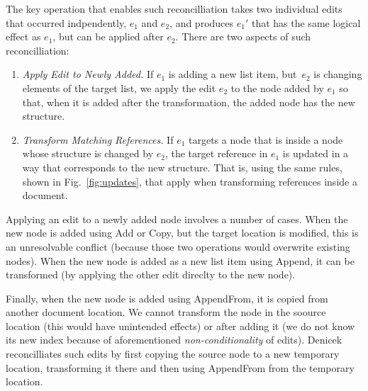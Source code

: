 \documentclass[sigconf,anonymous,screen]{acmart}
\newcommand{\ident}[1]{{\sffamily #1}}
\begin{document}
The key operation that enables such reconcilliation takes two individual edits that occurred
indpendently, $e_1$ and $e_2$, and produces $e_1'$ that has the same logical effect as
$e_1$, but can be applied after $e_2$. There are two aspects of such reconcilliation:

\begin{enumerate}
\item \emph{Apply Edit to Newly Added.} If $e_1$ is adding a new list item, but~$e_2$ is
  changing elements of the target list, we apply the edit $e_2$ to the node added by $e_1$ so
  that, when it is added after the transformation, the added node has the new structure.

\item \emph{Transform Matching References.} If $e_1$ targets a node that is inside a node
  whose structure is changed by $e_2$, the target reference in $e_1$ is updated in a way that
  corresponds to the new structure. That is, using the same rules, shown in Fig.~\ref{fig:updates},
  that apply when transforming references inside a document.
\end{enumerate}

Applying an edit to a newly added node involves a number of cases. When the new node is added
using \ident{Add} or \ident{Copy}, but the target location is modified, this is an unresolvable
conflict (because those two operations would overwrite existing nodes). When the new node is
added as a new list item using \ident{Append}, it can be transformed (by applying the other
edit direclty to the new node).

Finally, when the new node is added using \ident{AppendFrom},
it is copied from another document location. We cannot transform the node in the soource location
(this would have unintended effects) or after adding it (we do not know its new index because of
aforementioned \emph{non-conditionality} of edits). Denicek reconcilliates such edits by first
copying the source node to a new temporary location, transforming it there and then using
\ident{AppendFrom} from the temporary location.


\end{document}
